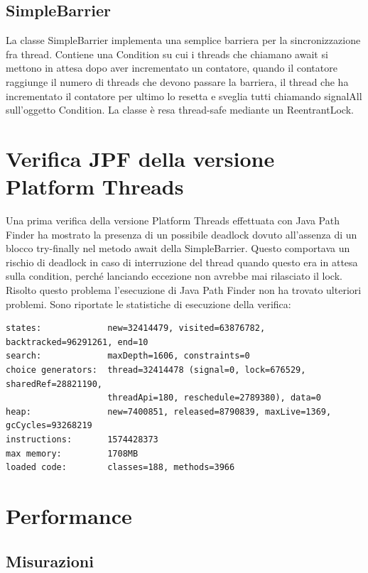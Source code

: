 \documentclass[11pt,notitlepage]{article}
\begin{document}
\subsection{SimpleBarrier}
La classe \textsf{SimpleBarrier} implementa una semplice barriera per la sincronizzazione fra thread. Contiene una \textsf{Condition} su cui i threads che chiamano
\textsf{await} si mettono in attesa dopo aver incrementato un contatore, quando il contatore raggiunge il numero di threads che devono passare la barriera, il 
thread che ha incrementato il contatore per ultimo lo resetta e sveglia tutti chiamando \textsf{signalAll} sull'oggetto \textsf{Condition}.
La classe è resa thread-safe mediante un \textsf{ReentrantLock}.

\section{Verifica JPF della versione Platform Threads}
Una prima verifica della versione Platform Threads effettuata con Java Path Finder ha mostrato la presenza di un possibile deadlock dovuto all'assenza di un blocco try-finally
nel metodo \textsf{await} della \textsf{SimpleBarrier}. Questo comportava un rischio di deadlock in caso di interruzione del thread quando questo era in attesa sulla condition, perché 
lanciando eccezione non avrebbe mai rilasciato il lock.
Risolto questo problema l'esecuzione di Java Path Finder non ha trovato ulteriori problemi.
Sono riportate le statistiche di esecuzione della verifica:
\begin{verbatim}
states:             new=32414479, visited=63876782, backtracked=96291261, end=10
search:             maxDepth=1606, constraints=0
choice generators:  thread=32414478 (signal=0, lock=676529, sharedRef=28821190, 
                    threadApi=180, reschedule=2789380), data=0
heap:               new=7400851, released=8790839, maxLive=1369, gcCycles=93268219
instructions:       1574428373
max memory:         1708MB
loaded code:        classes=188, methods=3966
\end{verbatim}

\section{Performance}

\subsection{Misurazioni}
\end{document}
